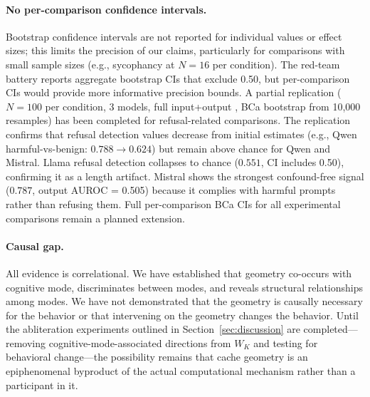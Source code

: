\paragraph{No per-comparison confidence intervals.}
Bootstrap confidence intervals are not reported for individual \auroc values or effect sizes; this limits the precision of our claims, particularly for comparisons with small sample sizes (e.g., sycophancy at $N = 16$ per condition).
The red-team battery reports aggregate bootstrap CIs that exclude 0.50, but per-comparison CIs would provide more informative precision bounds.
A partial replication ($N = 100$ per condition, 3 models, full input+output \fwl, BCa bootstrap from 10{,}000 resamples) has been completed for refusal-related comparisons.
The replication confirms that refusal detection \auroc values decrease from initial estimates (e.g., Qwen harmful-vs-benign: $0.788 \rightarrow 0.624$) but remain above chance for Qwen and Mistral.
Llama refusal detection collapses to chance ($0.551$, CI includes 0.50), confirming it as a length artifact.
Mistral shows the strongest confound-free signal ($0.787$, output AUROC = 0.505) because it complies with harmful prompts rather than refusing them.
Full per-comparison BCa CIs for all experimental comparisons remain a planned extension.

\paragraph{Causal gap.}
All evidence is correlational.
We have established that \kvcache geometry co-occurs with cognitive mode, discriminates between modes, and reveals structural relationships among modes.
We have not demonstrated that the geometry is causally necessary for the behavior or that intervening on the geometry changes the behavior.
Until the abliteration experiments outlined in Section~\ref{sec:discussion} are completed---removing cognitive-mode-associated directions from $W_K$ and testing for behavioral change---the possibility remains that cache geometry is an epiphenomenal byproduct of the actual computational mechanism rather than a participant in it.